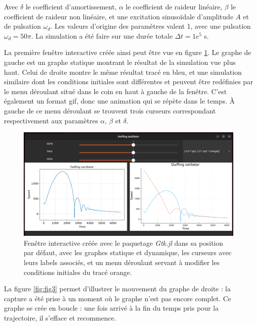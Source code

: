 \documentclass[a4paper, french, 12pt, titlepage]{article}
\begin{document}
Avec $\delta$ le coefficient d'amortissement, $\alpha$ le coefficient de raideur linéaire, $\beta$ le coefficient de raideur non linéaire, et une excitation sinusoïdale d'amplitude $A$ et de pulsation $\omega_d$. Les valeurs d'origine des paramètres valent 1, avec une pulsation $\omega_d  = 50\pi$. La simulation a été faire sur une durée totale $\Delta t = 1e^5$ s.


La première fenêtre interactive créée ainsi peut être vue en figure  \ref{fig:interactive1}. 
Le graphe de gauche est un graphe statique montrant le résultat de la simulation vue plus haut. Celui de droite montre le même résultat tracé en bleu, et une simulation similaire dont les conditions initiales sont différentes et peuvent être redéfinies par le menu déroulant situé dans le coin en haut à gauche de la fenêtre. 
C'est également un format gif, donc une animation qui se répète dans le temps. 
À gauche de ce menu déroulant se trouvent trois curseurs correspondant respectivement aux paramètres $\alpha$, $\beta$ et $\delta$. 

\begin{figure}[H]
  \begin{center}
    \includegraphics[width=\linewidth]{interactivewindow_1.png}
  \end{center}

  \caption{Fenêtre interactive créée avec le paquetage \emph{Gtk.jl} dans sa position par défaut, avec les graphes statique et dynamique, les curseurs avec leurs labels associés, et un menu déroulant servant à modifier les conditions initiales du tracé orange.}
  \label{fig:interactive1}
\end{figure}


La figure \ref{fig:fig3} permet d'illustrer le mouvement du graphe de droite : la capture a été prise à un moment où le graphe n'est pas encore complet.
Ce graphe se crée en boucle : une fois arrivé à la fin du temps pris pour la trajectoire, il s'efface et recommence. 
\end{document}
